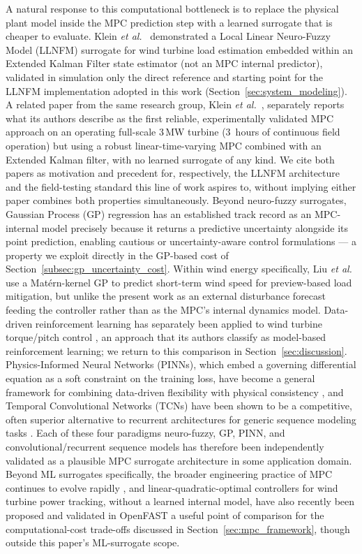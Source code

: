 A natural response to this computational bottleneck is to replace the
physical plant model inside the MPC prediction step with a learned
surrogate that is cheaper to evaluate. Klein \emph{et al.}~\cite{klein2024} demonstrated a Local Linear Neuro-Fuzzy Model
(LLNFM) surrogate for wind turbine load estimation  embedded within an
Extended Kalman Filter state estimator (not an MPC internal predictor),
validated in simulation only  the direct reference and starting point
for the LLNFM implementation adopted in this work
(Section~\ref{sec:system_modeling}). {\color{auditP2}A related paper from the same
research group, Klein \emph{et al.}~\cite{klein2025}, separately reports what its
authors describe as the first reliable, experimentally validated MPC
approach on an operating full-scale 3\,MW turbine
(3~hours of continuous field operation)  but using a robust
linear-time-varying MPC combined with an Extended Kalman filter, with no
learned surrogate of any kind.} We cite both papers as motivation and
precedent for, respectively, the LLNFM architecture and the field-testing
standard this line of work aspires to, without implying either paper
combines both properties simultaneously. {\color{auditP2}Beyond neuro-fuzzy
surrogates, Gaussian Process (GP) regression has an established track
record as an MPC-internal model precisely because it returns a
predictive uncertainty alongside its point prediction, enabling cautious
or uncertainty-aware control formulations \cite{kocijan2004,hewing2020} —
a property we exploit directly in the GP-based cost of
Section~\ref{subsec:gp_uncertainty_cost}.} Within wind energy specifically,
Liu \emph{et al.}~\cite{liu_wind_2018} use a Mat\'ern-kernel GP to predict short-term wind
speed for preview-based load mitigation, but  unlike the present
work  as an external disturbance forecast feeding the controller
rather than as the MPC's internal dynamics model. {\color{auditP2}Data-driven
reinforcement learning has separately been applied to wind turbine
torque/pitch control \cite{xie_data-driven_2023}, an approach that its authors classify as model-based reinforcement learning; we return to this comparison in
Section~\ref{sec:discussion}.} Physics-Informed Neural Networks
(PINNs), which embed a governing differential equation as a soft
constraint on the training loss, have become a general framework for
combining data-driven flexibility with physical consistency
\cite{raissi2019,karniadakis2021}, and Temporal Convolutional Networks
(TCNs) have been shown to be a competitive, often superior alternative to
recurrent architectures for generic sequence modeling tasks
\cite{bai2018}. Each of these four paradigms neuro-fuzzy, GP, PINN,
and convolutional/recurrent sequence models has therefore been
independently validated as a plausible MPC surrogate architecture in some
application domain. {\color{auditP2}Beyond ML surrogates specifically, the broader
engineering practice of MPC continues to evolve rapidly
\cite{schwenzer2021}, and linear-quadratic-optimal controllers
for wind turbine power tracking, without a learned
internal model, have also recently been proposed and validated in
OpenFAST \cite{grapentin2022,grapentin2024}  a useful point of
comparison for the computational-cost trade-offs discussed in
Section~\ref{sec:mpc_framework}, though outside this paper's
ML-surrogate scope.}

